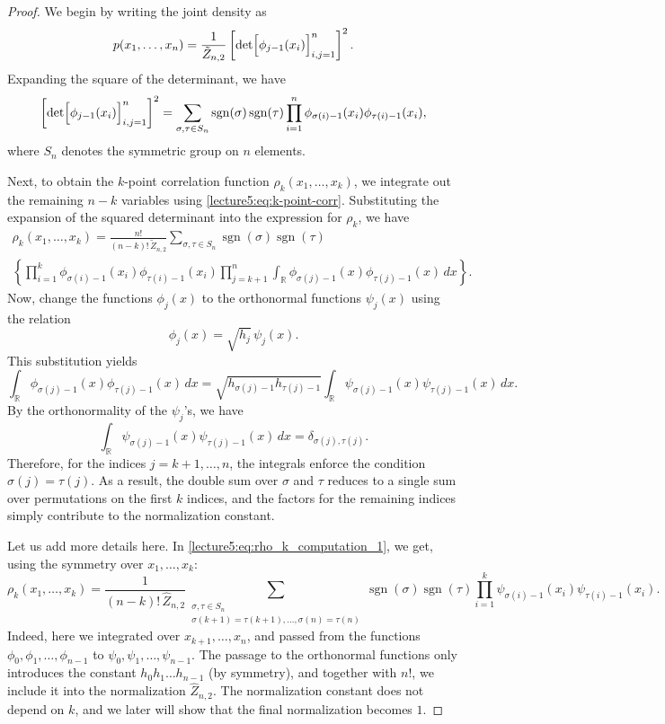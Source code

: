 \documentclass[letterpaper,11pt,oneside,reqno]{book}
\numberwithin{equation}{chapter}  %
\theoremstyle{definition}
\begin{document}
\begin{proof}
We begin by writing the joint density as
\[
p(x_1,\dots,x_n)=\frac{1}{\tilde{Z}_{n,2}} \left[\det\Bigl[\phi_{j-1}(x_i)\Bigr]_{i,j=1}^n\right]^2.
\]
Expanding the square of the determinant, we have
\[
\left[\det\Bigl[\phi_{j-1}(x_i)\Bigr]_{i,j=1}^n\right]^2 = \sum_{\sigma,\tau\in S_n} \operatorname{sgn}(\sigma)\operatorname{sgn}(\tau) \prod_{i=1}^n \phi_{\sigma(i)-1}(x_i)\phi_{\tau(i)-1}(x_i),
\]
where $S_n$ denotes the symmetric group on $n$ elements.

Next, to obtain the $k$-point correlation function $\rho_k(x_1,\dots,x_k)$, we integrate out the remaining $n-k$ variables
using \eqref{lecture5:eq:k-point-corr}.
Substituting the expansion of the squared determinant into the expression for $\rho_k$, we have
\begin{multline}
	\label{lecture5:eq:rho_k_computation_1}
\rho_k(x_1,\dots,x_k)=\frac{n!}{(n-k)!\,\tilde{Z}_{n,2}} \sum_{\sigma,\tau\in S_n} \operatorname{sgn}(\sigma)\operatorname{sgn}(\tau) \\
\left\{ \prod_{i=1}^k \phi_{\sigma(i)-1}(x_i)\phi_{\tau(i)-1}(x_i) \prod_{j=k+1}^n \int_{\mathbb{R}} \phi_{\sigma(j)-1}(x)\phi_{\tau(j)-1}(x)\,dx \right\}.
\end{multline}
Now, change the functions $\phi_j(x)$ to the orthonormal functions $\psi_j(x)$ using the relation
\[
\phi_j(x)=\sqrt{h_j}\,\psi_j(x).
\]
This substitution yields
\[
\int_{\mathbb{R}} \phi_{\sigma(j)-1}(x)\phi_{\tau(j)-1}(x)\,dx = \sqrt{h_{\sigma(j)-1}h_{\tau(j)-1}} \int_{\mathbb{R}} \psi_{\sigma(j)-1}(x)\psi_{\tau(j)-1}(x)\,dx.
\]
By the orthonormality of the $\psi_j$'s, we have
\[
\int_{\mathbb{R}} \psi_{\sigma(j)-1}(x)\psi_{\tau(j)-1}(x)\,dx = \delta_{\sigma(j),\tau(j)}.
\]
Therefore, for the indices $j=k+1,\dots,n$, the integrals enforce the condition $\sigma(j)=\tau(j)$. As a result, the double sum over $\sigma$ and $\tau$ reduces to a single sum over permutations on the first $k$ indices, and the factors for the remaining indices simply contribute to the normalization constant.

Let us add more details here.
In \eqref{lecture5:eq:rho_k_computation_1}, we get, using the symmetry over $x_1,\ldots,x_k $:
\begin{equation}
	\label{lecture5:eq:rho_k_computation_2}
	\rho_k(x_1,\dots,x_k)=\frac{1}{(n-k)!\,\widehat{Z}_{n,2}}
	\sum_{\substack{\sigma,\tau\in S_n\\
	\sigma(k+1)=\tau(k+1),\ldots,\sigma(n)=\tau(n) }} \operatorname{sgn}(\sigma)\operatorname{sgn}(\tau)
	\prod_{i=1}^k \psi_{\sigma(i)-1}(x_i)\psi_{\tau(i)-1}(x_i)  .
\end{equation}
Indeed, here we integrated over $x_{k+1},\ldots,x_n $, and passed
from the functions $\phi_0,\phi_1,\ldots,\phi_{n-1} $
to
$\psi_0,\psi_1,\ldots,\psi_{n-1} $.
The passage to the orthonormal functions only introduces the constant
$h_0h_1\ldots h_{n-1} $ (by symmetry), and together with $n!$, we include it into the
normalization $\widehat{Z}_{n,2} $. The normalization constant does not depend on $k$, and
we later will show that the final normalization becomes $1$.


\end{proof}
\end{document}
